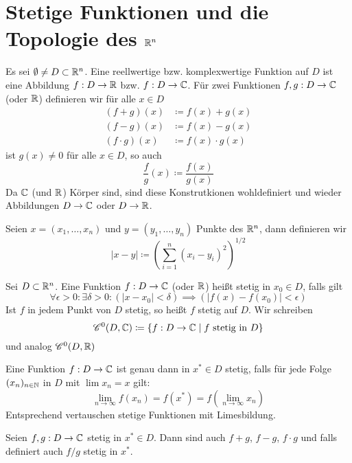 \section{Stetige Funktionen und die Topologie des $\mathbb{R}^n$}
\begin{defn}
    Es sei $\emptyset\neq D\subset \mathbb{R}^n$. Eine reellwertige bzw. komplexwertige Funktion auf $D$ ist eine Abbildung $f:D\to \mathbb{R}$ bzw. $f:D\to \mathbb{C}$.
    Für zwei Funktionen $f,g:D\to \mathbb{C}$ (oder $\mathbb{R}$) definieren wir für alle $x\in D$
    \begin{align*}
        (f+g)(x) &\coloneqq f(x)+g(x) \\
        (f-g)(x) &\coloneqq f(x)-g(x) \\
        (f\cdot g)(x) &\coloneqq f(x)\cdot g(x) 
    \end{align*}
    ist $g(x)\neq 0$ für alle $x\in D$, so auch 
    \[
    \frac{f}{g}(x) \coloneqq \frac{f(x)}{g(x)}    
    \]
    Da $\mathbb{C}$ (und $\mathbb{R}$) Körper sind, sind diese Konstrutkionen wohldefiniert und wieder Abbildungen $D\to \mathbb{C}$ oder $D\to \mathbb{R}$.
\end{defn}
\begin{defn}
    Seien $x=(x_1,\ldots,x_n)$ und $y=(y_1,\ldots,y_n)$ Punkte des $\mathbb{R}^n$, dann definieren wir 
    \[
    \vert x-y\vert \coloneqq \left(\sum_{i=1}^n (x_i-y_i)^2\right)^{1/2}    
    \]
\end{defn}
\begin{defn}
    Sei $D\subset \mathbb{R}^n$. Eine Funktion $f:D\to \mathbb{C}$ (oder $\mathbb{R}$) heißt stetig in $x_0\in D$, falls gilt
    \[
    \forall \epsilon >0 : \exists \delta >0 : (\vert x-x_0\vert<\delta) \implies (\vert f(x)-f(x_0)\vert < \epsilon)    
    \]
    Ist $f$ in jedem Punkt von $D$ stetig, so heißt $f$ stetig auf $D$. Wir schreiben
    \[
    \mathscr{C}^0(D,\mathbb{C}) \coloneqq \{ f:D\to \mathbb{C} \mid f \text{ stetig in } D\}    
    \]
    und analog $\mathscr{C}^0(D,\mathbb{R})$
\end{defn}
\begin{satz}
    Eine Funktion $f:D\to \mathbb{C}$ ist genau dann in $x^*\in D$ stetig, falls für jede Folge $(x_n)_{n\in \mathbb{N}}$ in $D$ mit $\lim x_n =x$ gilt:
    \[
    \lim_{n\to \infty} f(x_n) = f(x^*) = f(\lim_{n\to\infty} x_n)
    \]
    Entsprechend \glqq vertauschen stetige Funktionen mit  Limesbildung\grqq.
\end{satz}
\begin{satz}[Rechenregeln]
    Seien $f,g:D\to \mathbb{C}$ stetig in $x^*\in D$. Dann sind auch $f+g$, $f-g$, $f\cdot g$ und falls definiert auch $f/g$ stetig in $x^*$.
\end{satz}
